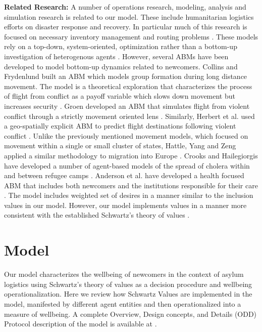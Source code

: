 \documentclass{scspaperproc}
\theoremstyle{scsthe}
\begin{document}
{\bf Related Research:} A number of operations research, modeling, analysis and simulation research is related to our model. These include humanitarian logistics efforts on disaster response and recovery. In particular much of this research is focused on necessary inventory management and routing problems \cite{67}. These models rely on a top-down, system-oriented, optimization rather than a bottom-up investigation of heterogenous agents \cite{13,31,34}. However, several ABMs have been developed to model bottom-up dynamics related to newcomers. Collins and Frydenlund built an ABM which models group formation during long distance movement. The model is a theoretical exploration that characterizes the process of flight from conflict as a payoff variable which slows down movement but increases security \cite{22}. Groen developed an ABM that simulates flight from violent conflict through a strictly movement oriented lens \cite{37}. Similarly, Herbert et al. used a geo-spatially explicit ABM to predict flight destinations following violent conflict \cite{43}. Unlike the previously mentioned movement models, which focused on movement within a single or small cluster of states, Hattle, Yang and Zeng applied a similar methodology to migration into Europe \cite{42}. Crooks and Hailegiorgis have developed a number of agent-based models of the spread of cholera within and between refugee camps \cite{28,38}. Anderson et al. have developed a health focused ABM that includes both newcomers and the institutions responsible for their care \cite{4}. The model includes weighted set of desires in a manner similar to the inclusion values in our model. However, our model implements values in a manner more consistent with the established Schwartz's theory of values \cite{phil.masters.thesis}.

\section{Model}

Our model characterizes the wellbeing of newcomers in the context of asylum logistics using Schwartz's theory of values as a decision procedure and wellbeing operationalization. Here we review how Schwartz Values are implemented in the model, manifested by different agent entities and then operationalized into a measure of wellbeing. A complete Overview, Design concepts, and Details (ODD) Protocol description of the model is available at \cite{phil.masters.thesis}.
\end{document}
